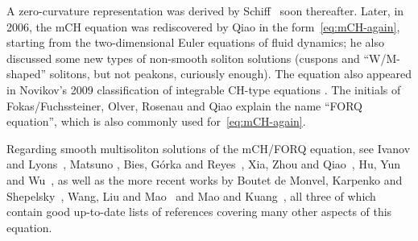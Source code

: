 \documentclass[10pt,a4paper]{article} \pdfoutput=1 
\begin{document}
A zero-curvature representation was derived by Schiff~\cite{schiff:1996:CH-dual-hierarchies-zero-curvature-formulations} soon thereafter.
Later, in 2006, the mCH equation was rediscovered by Qiao
\cite{qiao:2006:mCH-new-integrable-cuspons-WMpeakons, qiao:2007:mCH-new-integrable-hierarchy-parametric-cuspons-peakons-MWpeakons}
in the form~\eqref{eq:mCH-again},
starting from the two-dimensional Euler equations of fluid dynamics;
he also discussed some new types of non-smooth soliton solutions (cuspons and ``W/M-shaped'' solitons,
but not peakons, curiously enough).
The equation also appeared in Novikov's 2009 classification of integrable CH-type equations
\cite[eq.~(32)]{novikov:2009:generalizations-of-CH}.
The initials of Fokas/Fuchssteiner, Olver, Rosenau and Qiao
explain the name ``FORQ equation'', which is also commonly used for~\eqref{eq:mCH-again}.


Regarding smooth multisoliton solutions of the mCH/FORQ equation, see
Ivanov and Lyons~\cite{ivanov-lyons:2012:qiao-hierarchy-dark-solitons},
Matsuno \cite{matsuno:2013:modified-cubic-CH-backlund-multisolitons, matsuno:2014:modified-cubic-CH-multisolitons},
Bies, Górka and Reyes~\cite{bies-gorka-reyes:2012:mCH-geometry-and-local-analysis},
Xia, Zhou and Qiao~\cite{xia-zhou-qiao:2016:CH-mCH-darboux-transformations-multisolitons},
Hu, Yun and Wu~\cite{hu-yin-wu:2016:mCH-bilinear-equations-new-multisoliton-solutions},
as well as the more recent works
by Boutet de Monvel, Karpenko and Shepelsky~\cite{boutetdemonvel-karpenko-shepelsky:2020:mCH-nonzero-boundary-conditions-riemann-hilbert-approach},
Wang, Liu and Mao~\cite{wang-liu-mao:2020:mcH-backlund-transformation-and-nonlinear-superposition-formula}
and Mao and Kuang~\cite{mao-kuang:2021:mCH-solitons-via-dressing-method},
all three of which contain good up-to-date lists of references covering many other aspects of this equation.
\end{document}
